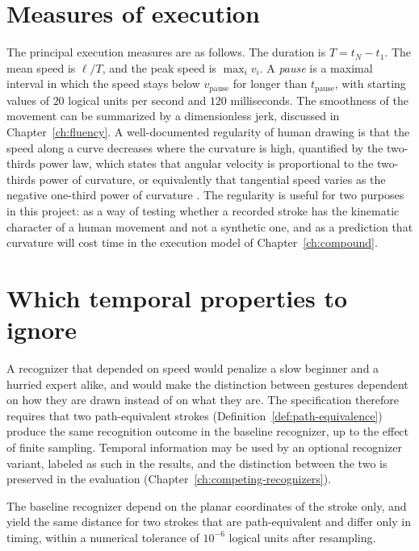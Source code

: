 \section{Measures of execution}

The principal execution measures are as follows. The duration is $T=t_N-t_1$. The mean speed is $\ell/T$, and the peak speed is $\max_i v_i$. A \emph{pause} is a maximal interval in which the speed stays below $v_{\mathrm{pause}}$ for longer than $t_{\mathrm{pause}}$, with starting values of $20$ logical units per second and $120$ milliseconds. The smoothness of the movement can be summarized by a dimensionless jerk, discussed in Chapter~\ref{ch:fluency}. A well-documented regularity of human drawing is that the speed along a curve decreases where the curvature is high, quantified by the two-thirds power law, which states that angular velocity is proportional to the two-thirds power of curvature, or equivalently that tangential speed varies as the negative one-third power of curvature \cite{lacquaniti1983}.\evD{} The regularity is useful for two purposes in this project: as a way of testing whether a recorded stroke has the kinematic character of a human movement and not a synthetic one, and as a prediction that curvature will cost time in the execution model of Chapter~\ref{ch:compound}.

\section{Which temporal properties to ignore}

A recognizer that depended on speed would penalize a slow beginner and a hurried expert alike, and would make the distinction between gestures dependent on how they are drawn instead of on what they are. The specification therefore requires that two path-equivalent strokes (Definition~\ref{def:path-equivalence}) produce the same recognition outcome in the baseline recognizer, up to the effect of finite sampling. Temporal information may be used by an optional recognizer variant, labeled as such in the results, and the distinction between the two is preserved in the evaluation (Chapter~\ref{ch:competing-recognizers}).

\begin{requirement}\label{req:time-invariance}
The baseline recognizer \must{} depend on the planar coordinates of the stroke only, and \must{} yield the same distance for two strokes that are path-equivalent and differ only in timing, within a numerical tolerance of $10^{-6}$ logical units after resampling.\evS
\end{requirement}

